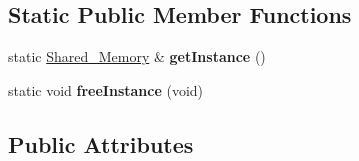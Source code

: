 \subsection*{Static Public Member Functions}
\begin{DoxyCompactItemize}
\item 
\mbox{\label{class_shared___memory_a74b498d41295b1dd006ac6f1f0b6065d}} 
static \hyperlink{class_shared___memory}{Shared\+\_\+\+Memory} \& {\bfseries get\+Instance} ()
\item 
\mbox{\label{class_shared___memory_af232a41a63eac5a08f762400e8086052}} 
static void {\bfseries free\+Instance} (void)
\end{DoxyCompactItemize}
\subsection*{Public Attributes}
